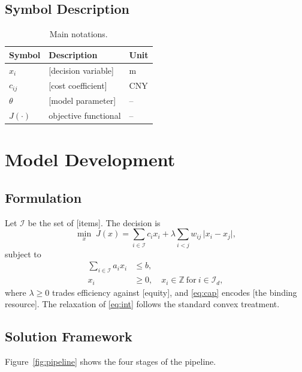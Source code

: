\documentclass{swmcmthesis}
\begin{document}
\subsection{Symbol Description}
\begin{table}[!h]
\centering
\caption{Main notations.}
\label{tab:notation}
\begin{tabular}{lll}
\toprule[1.5pt]
Symbol & Description & Unit \\
\midrule[1pt]
$x_{i}$        & [decision variable]      & m \\
$c_{ij}$       & [cost coefficient]       & CNY \\
$\theta$       & [model parameter]        & -- \\
$J(\cdot)$     & objective functional     & -- \\
\bottomrule[1.5pt]
\end{tabular}
\end{table}

\section{Model Development}

\subsection{Formulation}
Let $\mathcal{I}$ be the set of [items]. The decision is
\begin{equation}
  \min_{x}\; J(x)=\sum_{i\in\mathcal{I}} c_{i}x_{i}
      +\lambda\sum_{i<j} w_{ij}\,\lvert x_{i}-x_{j}\rvert ,
  \label{eq:obj}
\end{equation}
subject to
\begin{align}
  \sum_{i\in\mathcal{I}} a_{i}x_{i} &\le b, \label{eq:cap}\\
  x_{i} &\ge 0,\quad x_{i}\in\mathbb{Z}\ \text{for}\ i\in\mathcal{I}_{d},
  \label{eq:int}
\end{align}
where $\lambda\ge 0$ trades efficiency against [equity], and \eqref{eq:cap}
encodes [the binding resource]. The relaxation of \eqref{eq:int} follows the
standard convex treatment.

\subsection{Solution Framework}
Figure~\ref{fig:pipeline} shows the four stages of the pipeline.
\end{document}
